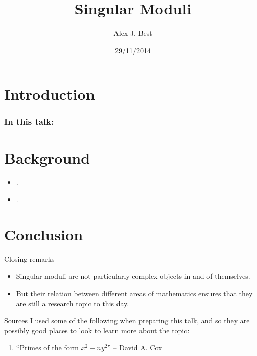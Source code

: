 \documentclass{beamer}
\author{Alex J. Best}
\institute{WIMP 2014}
\date{29/11/2014}
\title{Singular Moduli}
\begin{document}
\section{Introduction}


\begin{frame}
\frametitle{In this talk:}
\tableofcontents
\end{frame}

\section{Background}

\begin{frame}{}
\begin{itemize}
\item .
\pause \item .
\end{itemize}
\end{frame}

\section{Conclusion}
\begin{frame}{Closing remarks}
\begin{itemize}
\item Singular moduli are not particularly complex objects in and of themselves.
\pause \item But their relation between different areas of mathematics ensures that they are still a research topic to this day.
\end{itemize}
\end{frame}

\begin{frame}{Sources}
I used some of the following when preparing this talk, and so they are possibly good places to look to learn more about the topic:
\begin{enumerate}
\item ``Primes of the form $x^2 + ny^2$'' -- David A. Cox
\end{enumerate}
\end{frame}
\end{document}
